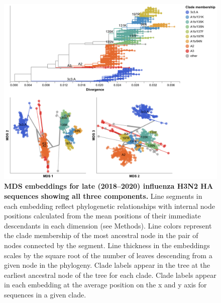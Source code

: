 \begin{figure}[!h]
\includegraphics[width=\columnwidth]{figures/flu-2018-2020-mds-by-clade.png}
\caption{{\bf MDS embeddings for late (2018--2020) influenza H3N2 HA sequences showing all three components.}
Line segments in each embedding reflect phylogenetic relationships with internal node positions calculated from the mean positions of their immediate descendants in each dimension (see Methods).
Line colors represent the clade membership of the most ancestral node in the pair of nodes connected by the segment.
Line thickness in the embeddings scales by the square root of the number of leaves descending from a given node in the phylogeny.
Clade labels appear in the tree at the earliest ancestral node of the tree for each clade.
Clade labels appear in each embedding at the average position on the x and y axis for sequences in a given clade.}\label{S_Fig_late_flu_mds_embeddings}
\end{figure}

